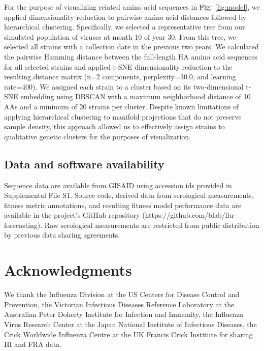 \documentclass[9pt,lineno]{elife} %
\providecommand{\DIFadd}[1]{{\protect\color{blue}\uwave{#1}}} %
\providecommand{\DIFdel}[1]{{\protect\color{red}\sout{#1}}}                      %
\providecommand{\DIFaddbegin}{} %
\providecommand{\DIFaddend}{} %
\providecommand{\DIFdelbegin}{} %
\providecommand{\DIFdelend}{} %
\providecommand{\DIFaddtex}[1]{{\protect\color{blue}\uwave{#1}}} %
\providecommand{\DIFdeltex}[1]{{\protect\color{red}\sout{#1}}}                      %
\providecommand{\DIFaddbegin}{} %
\providecommand{\DIFaddend}{} %
\providecommand{\DIFdelbegin}{} %
\providecommand{\DIFdelend}{} %
\providecommand{\DIFadd}[1]{\texorpdfstring{\DIFaddtex{#1}}{#1}} %
\providecommand{\DIFdel}[1]{\texorpdfstring{\DIFdeltex{#1}}{}} %
\newcommand{\DIFscaledelfig}{0.5}
\newlength{\DIFdelgraphicswidth} %
\newlength{\DIFdelgraphicsheight} %
\newcommand{\DIFaddincludegraphics}[2][]{{\color{blue}\fbox{\DIFOincludegraphics[#1]{#2}}}} %
\newcommand{\DIFdelincludegraphics}[2][]{%
\sbox{\DIFdelgraphicsbox}{\DIFOincludegraphics[#1]{#2}}%
\settoboxwidth{\DIFdelgraphicswidth}{\DIFdelgraphicsbox} %
\settoboxtotalheight{\DIFdelgraphicsheight}{\DIFdelgraphicsbox} %
\scalebox{\DIFscaledelfig}{%
\parbox[b]{\DIFdelgraphicswidth}{\usebox{\DIFdelgraphicsbox}\\[-\baselineskip] \rule{\DIFdelgraphicswidth}{0em}}\llap{\resizebox{\DIFdelgraphicswidth}{\DIFdelgraphicsheight}{%
\setlength{\unitlength}{\DIFdelgraphicswidth}%
\begin{picture}(1,1)%
\thicklines\linethickness{2pt} %
{\color[rgb]{1,0,0}\put(0,0){\framebox(1,1){}}}%
{\color[rgb]{1,0,0}\put(0,0){\line( 1,1){1}}}%
{\color[rgb]{1,0,0}\put(0,1){\line(1,-1){1}}}%
\end{picture}%
}\hspace*{3pt}}} %
} %
\DeclareRobustCommand{\DIFaddbegin}{\DIFOaddbegin \let\includegraphics\DIFaddincludegraphics} %
\DeclareRobustCommand{\DIFaddend}{\DIFOaddend \let\includegraphics\DIFOincludegraphics} %
\DeclareRobustCommand{\DIFdelbegin}{\DIFOdelbegin \let\includegraphics\DIFdelincludegraphics} %
\DeclareRobustCommand{\DIFdelend}{\DIFOaddend \let\includegraphics\DIFOincludegraphics} %
\begin{document}
For the purpose of visualizing related amino acid sequences in \DIFdelbegin \DIFdel{Fig.}\DIFdelend \DIFaddbegin \DIFadd{Figure}\DIFaddend ~\ref{fig:model}, we applied dimensionality reduction to pairwise amino acid distances followed by hierarchical clustering.
Specifically, we selected a representative tree from our simulated population of viruses at month 10 of year 30.
From this tree, we selected all strains with a collection date in the previous two years.
We calculated the pairwise Hamming distance between the full-length HA amino acid sequences for all selected strains and applied t-SNE dimensionality reduction \DIFdelbegin %
\DIFdelend \DIFaddbegin \citep{vanDerMaaten2008} \DIFaddend to the resulting distance matrix (n=2 components, perplexity=30.0, and learning rate=400).
We assigned each strain to a cluster based on its two-dimensional t-SNE embedding using DBSCAN \DIFdelbegin %
\DIFdelend \DIFaddbegin \citep{Ester1996} \DIFaddend with a maximum neighborhood distance of 10 AAs and a minimum of 20 strains per cluster.
Despite known limitations of applying hierarchical clustering to manifold projections that do not preserve sample density, this approach allowed us to effectively assign strains to qualitative genetic clusters for the purposes of visualization.

\subsection*{Data and software availability}

Sequence data are available from GISAID using accession ids provided in Supplemental File S1.
Source code, derived data from serological measurements, fitness metric annotations, and resulting fitness model performance data are available in the project's GitHub repository (https://github.com/blab/flu-forecasting).
Raw serological measurements are restricted from public distribution by previous data sharing agreements.

\section*{Acknowledgments}

We thank the Influenza Division at the US Centers for Disease Control and Prevention, the Victorian Infectious Diseases Reference Laboratory at the Australian Peter Doherty Institute for Infection and Immunity, the Influenza Virus Research Center at the Japan National Institute of Infectious Diseases, the Crick Worldwide Influenza Centre at the UK Francis Crick Institute for sharing HI and FRA data.
\end{document}
